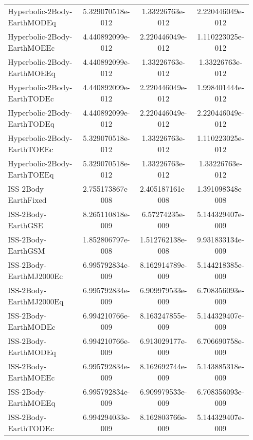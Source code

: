 \begin{table}[htbp!]
\begin{tabular}{lccc}
         Hyperbolic-2Body-EarthMODEq & 5.329070518e-012 & 1.33226763e-012 & 2.220446049e-012 \\
         Hyperbolic-2Body-EarthMOEEc & 4.440892099e-012 & 2.220446049e-012 & 1.110223025e-012 \\
         Hyperbolic-2Body-EarthMOEEq & 4.440892099e-012 & 1.33226763e-012 & 1.33226763e-012 \\
         Hyperbolic-2Body-EarthTODEc & 4.440892099e-012 & 2.220446049e-012 & 1.998401444e-012 \\
         Hyperbolic-2Body-EarthTODEq & 4.440892099e-012 & 2.220446049e-012 & 2.220446049e-012 \\
         Hyperbolic-2Body-EarthTOEEc & 5.329070518e-012 & 1.33226763e-012 & 1.110223025e-012 \\
         Hyperbolic-2Body-EarthTOEEq & 5.329070518e-012 & 1.33226763e-012 & 1.33226763e-012 \\
         ISS-2Body-EarthFixed & 2.755173867e-008 & 2.405187161e-008 & 1.391098348e-008 \\
         ISS-2Body-EarthGSE & 8.265110818e-009 & 6.57274235e-009 & 5.144329407e-009 \\
         ISS-2Body-EarthGSM & 1.852806797e-008 & 1.512762138e-008 & 9.931833134e-009 \\
         ISS-2Body-EarthMJ2000Ec & 6.995792834e-009 & 8.162914789e-009 & 5.144218385e-009 \\
         ISS-2Body-EarthMJ2000Eq & 6.995792834e-009 & 6.909979533e-009 & 6.708356093e-009 \\
         ISS-2Body-EarthMODEc & 6.994210766e-009 & 8.163247855e-009 & 5.144329407e-009 \\
         ISS-2Body-EarthMODEq & 6.994210766e-009 & 6.913029177e-009 & 6.706690758e-009 \\
         ISS-2Body-EarthMOEEc & 6.995792834e-009 & 8.162692744e-009 & 5.143885318e-009 \\
         ISS-2Body-EarthMOEEq & 6.995792834e-009 & 6.909979533e-009 & 6.708356093e-009 \\
         ISS-2Body-EarthTODEc & 6.994294033e-009 & 8.162803766e-009 & 5.144329407e-009 \\

\end{tabular}
\end{table}
